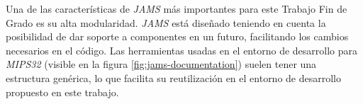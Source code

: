 Una de las características de \textit{JAMS} más importantes
para este Trabajo Fin de Grado es su alta modularidad.
\textit{JAMS} está diseñado teniendo en cuenta la posibilidad
de dar soporte a componentes en un futuro, facilitando los cambios
necesarios en el código.
Las herramientas usadas en el entorno de desarrollo para
\textit{MIPS32} (visible en la figura \ref{fig:jams-documentation})
suelen tener una estructura genérica,
lo que facilita su reutilización en el entorno de desarrollo
propuesto en este trabajo.